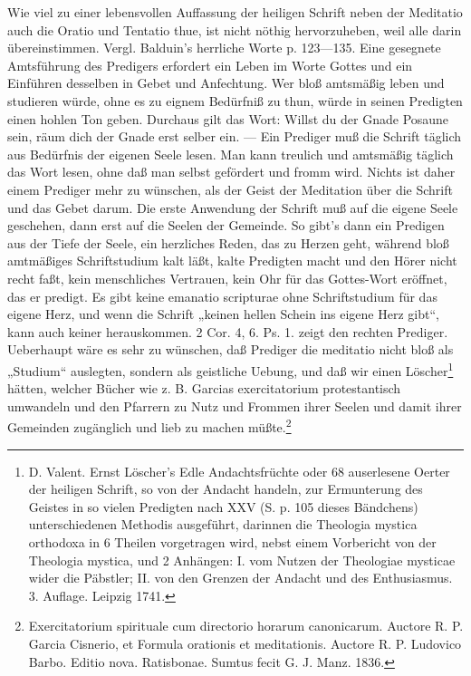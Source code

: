Wie viel zu einer lebensvollen Auffassung der heiligen Schrift neben der Meditatio auch die Oratio und Tentatio thue, ist nicht nöthig hervorzuheben, weil alle darin übereinstimmen. Vergl. Balduin’s herrliche Worte p. 123—135. Eine gesegnete Amtsführung des Predigers erfordert ein Leben im Worte Gottes und ein Einführen desselben in Gebet und Anfechtung. Wer bloß amtsmäßig leben und studieren würde, ohne es zu eignem Bedürfniß zu thun, würde in seinen Predigten einen hohlen Ton geben. Durchaus gilt das Wort: Willst du der Gnade Posaune sein, räum dich der Gnade erst selber ein. — Ein Prediger muß die Schrift täglich aus Bedürfnis
der eigenen Seele lesen. Man kann treulich und amtsmäßig täglich das Wort lesen, ohne daß man selbst gefördert und fromm wird. Nichts ist daher einem Prediger mehr zu wünschen, als der Geist der Meditation über die Schrift und das Gebet darum. Die erste Anwendung der Schrift muß auf die eigene Seele geschehen, dann erst auf die Seelen der Gemeinde. So gibt's dann ein Predigen aus der Tiefe der Seele, ein herzliches Reden, das zu Herzen geht, während bloß amtmäßiges Schriftstudium kalt läßt, kalte Predigten macht und den Hörer nicht recht faßt, kein menschliches Vertrauen, kein Ohr für das Gottes-Wort eröffnet, das er predigt. Es gibt keine emanatio scripturae ohne Schriftstudium für das eigene Herz, und wenn die Schrift „keinen hellen Schein ins eigene Herz gibt“, kann auch keiner herauskommen. 2 Cor. 4, 6. Ps. 1. zeigt den rechten Prediger. Ueberhaupt wäre es sehr zu wünschen, daß Prediger die meditatio nicht bloß als „Studium“ auslegten, sondern als geistliche Uebung, und daß wir einen Löscher\footnote{D. Valent. Ernst Löscher's Edle Andachtsfrüchte oder 68 auserlesene Oerter der heiligen Schrift, so von der Andacht handeln, zur Ermunterung des Geistes in so vielen Predigten nach XXV (S. p. 105 dieses Bändchens) unterschiedenen Methodis ausgeführt, darinnen die Theologia mystica orthodoxa in 6 Theilen vorgetragen wird, nebst einem Vorbericht von der Theologia mystica, und 2 Anhängen: I. vom Nutzen der Theologiae mysticae wider die Päbstler; II. von den Grenzen der Andacht und des Enthusiasmus. 3. Auflage. Leipzig 1741.} hätten, welcher Bücher wie z. B. Garcias exercitatorium protestantisch umwandeln und den Pfarrern zu Nutz und Frommen ihrer Seelen
und damit ihrer Gemeinden zugänglich und lieb zu machen müßte.\footnote{Exercitatorium spirituale cum directorio horarum canonicarum. Auctore R. P. Garcia Cisnerio, et Formula orationis et meditationis. Auctore R. P. Ludovico Barbo. Editio nova. Ratisbonae. Sumtus fecit G. J. Manz. 1836.}

